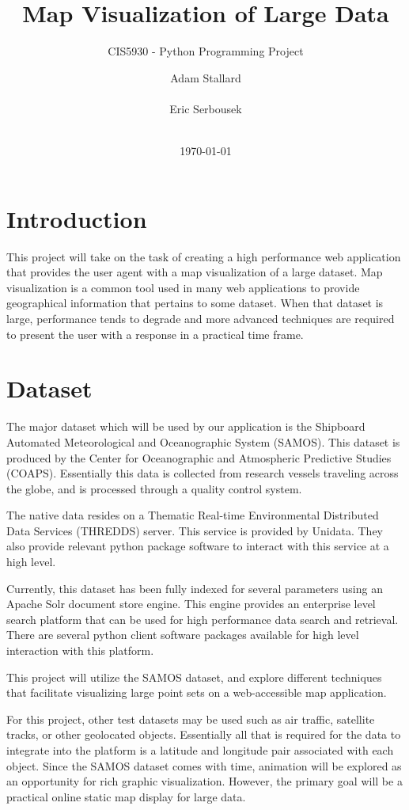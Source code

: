 \documentclass{acm_proc_article-sp}
\title{Map Visualization of Large Data}
\subtitle{CIS5930 - Python Programming Project}
\date{\today}
\author{
\alignauthor
Adam Stallard\\
       \affaddr{Florida State University}\\
       \email{aps10d@my.fsu.edu}
\alignauthor
Eric Serbousek\\
       \affaddr{Florida State University}\\
       \email{els16@my.fsu.edu}
}
\begin{document}
\maketitle
\section{Introduction}
This project will take on the task of creating a high performance web application that provides the user agent with a map visualization of a large dataset. Map visualization is a common tool used in many web applications to provide geographical information that pertains to some dataset. When that dataset is large, performance tends to degrade and more advanced techniques are required to present the user with a response in a practical time frame.

\section{Dataset}
The major dataset which will be used by our application is the Shipboard Automated Meteorological and Oceanographic System (SAMOS). This dataset is produced by the Center for Oceanographic and Atmospheric Predictive Studies (COAPS). Essentially this data is collected from research vessels traveling across the globe, and is processed through a quality control system.

The native data resides on a Thematic Real-time Environmental Distributed Data Services (THREDDS) server. This service is provided by Unidata. They also provide relevant python package software to interact with this service at a high level.

Currently, this dataset has been fully indexed for several parameters using an Apache Solr document store engine. This engine provides an enterprise level search platform that can be used for high performance data search and retrieval. There are several python client software packages available for high level interaction with this platform.

This project will utilize the SAMOS dataset, and explore different techniques that facilitate visualizing large point sets on a web-accessible map application.

For this project, other test datasets may be used such as air traffic, satellite tracks, or other geolocated objects. Essentially all that is required for the data to integrate into the platform is a latitude and longitude pair associated with each object. Since the SAMOS dataset comes with time, animation will be explored as an opportunity for rich graphic visualization. However, the primary goal will be a practical online static map display for large data.
\end{document}
